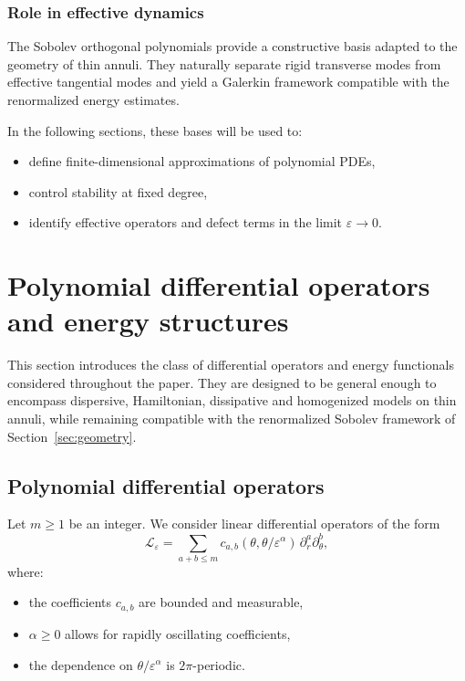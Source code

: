 \documentclass[11pt]{amsart}
\theoremstyle{plain}
\theoremstyle{definition}
\theoremstyle{remark}
\theoremstyle{remark}
\begin{document}
\subsubsection{Role in effective dynamics}

The Sobolev orthogonal polynomials provide a constructive basis adapted to the
geometry of thin annuli.
They naturally separate rigid transverse modes from effective tangential modes
and yield a Galerkin framework compatible with the renormalized energy estimates.

In the following sections, these bases will be used to:
\begin{itemize}
\item define finite-dimensional approximations of polynomial PDEs,
\item control stability at fixed degree,
\item identify effective operators and defect terms in the limit
$\varepsilon\to0$.
\end{itemize}

\section{Polynomial differential operators and energy structures}
\label{sec:operators}

This section introduces the class of differential operators and energy
functionals considered throughout the paper.
They are designed to be general enough to encompass dispersive,
Hamiltonian, dissipative and homogenized models on thin annuli, while
remaining compatible with the renormalized Sobolev framework of
Section~\ref{sec:geometry}.

\subsection{Polynomial differential operators}

Let $m\geq 1$ be an integer.
We consider linear differential operators of the form
\[
\mathcal L_\varepsilon
=
\sum_{a+b\le m}
c_{a,b}(\theta,\theta/\varepsilon^\alpha)\,
\partial_r^a\partial_\theta^b,
\]
where:
\begin{itemize}
\item the coefficients $c_{a,b}$ are bounded and measurable,
\item $\alpha\ge0$ allows for rapidly oscillating coefficients,
\item the dependence on $\theta/\varepsilon^\alpha$ is $2\pi$-periodic.
\end{itemize}
\end{document}
